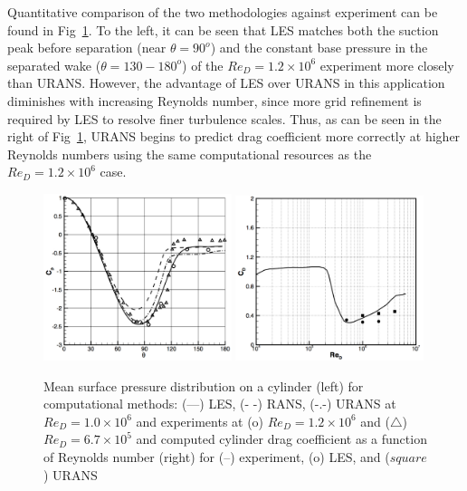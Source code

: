 \documentclass[journal]{new-aiaa}
\begin{document}
Quantitative comparison of the two methodologies against experiment can be found in Fig~\ref{fig:cylinderransvslesvalidation}. To the left, it can be seen that LES matches both the suction peak before separation (near $\theta=90^o$) and the constant base pressure in the separated wake ($\theta=130-180^o$) of the $Re_D = 1.2 \times 10^6$ experiment more closely than URANS. However, the advantage of LES over URANS in this application diminishes with increasing Reynolds number, since more grid refinement is required by LES to resolve finer turbulence scales. Thus, as can be seen in the right of Fig~\ref{fig:cylinderransvslesvalidation}, URANS begins to predict drag coefficient more correctly at higher Reynolds numbers using the same computational resources as the $Re_D = 1.2 \times 10^6$ case.





\begin{figure}[H]
\begin{center}
\includegraphics[width=0.49\textwidth]{Images/logan/catalano2003numerical_CylinderCp.pdf}
\includegraphics[width=0.49\textwidth]{Images/logan/catalano2003numerical_CylinderDrag.pdf}
\caption{ Mean surface pressure distribution on a cylinder (left) for computational methods: (---) LES, (- -) RANS, (-.-) URANS at $Re_D = 1.0 \times 10^6$ and experiments at (o) $Re_D = 1.2 \times 10^6$ and ($\triangle$) $Re_D = 6.7 \times 10^5$ and computed cylinder drag coefficient as a function of Reynolds number (right) for (--) experiment, (o) LES, and ($square$) URANS \cite{catalano2003numerical} }
\label{fig:cylinderransvslesvalidation}
\end{center}
\end{figure}
\end{document}
